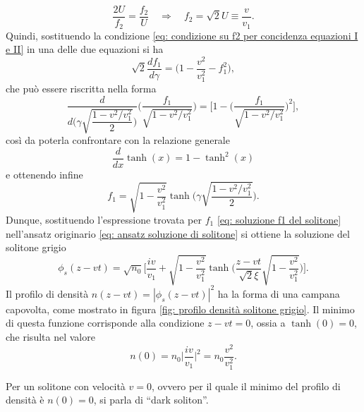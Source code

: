 \begin{equation}
\label{eq: condizione su f2 per concidenza equazioni I e II}
    \frac{2U}{f_2} = \frac{f_2}{U}\quad\Longrightarrow\quad f_2 = \sqrt{2}U \equiv \frac{v}{v_1}.
\end{equation}
Quindi, sostituendo la condizione \eqref{eq: condizione su f2 per concidenza equazioni I e II} in una delle due equazioni si ha
\begin{equation}
    \sqrt{2}\dfrac{df_1}{d\gamma} = \bigg(1 - \frac{v^2}{v_1^2} - f_1^2\bigg),
\end{equation}
che può essere riscritta nella forma 
\begin{equation}
    \frac{d}{d\bigg(\gamma\sqrt{\dfrac{1 - v^2/v_1^2}{2}}\bigg)}\bigg(\frac{f_1}{\sqrt{1 - v^2/v_1^2}}\bigg) = \bigg[ 1 - \bigg(\frac{f_1}{\sqrt{1 - v^2/v_1^2}}\bigg)^2\bigg],
\end{equation}
così da poterla confrontare con la relazione generale
\begin{equation}
    \frac{d}{dx}\tanh{(x)} = 1 - \tanh^2{(x)}
\end{equation}
e ottenendo infine
\begin{equation}
\label{eq: soluzione f1 del solitone}
    f_1 = \sqrt{1 - \frac{v^2}{v_1^2}}\tanh{\bigg(\gamma\sqrt{\frac{1 - v^2/v_1^2}{2}}\bigg)}.
\end{equation}
Dunque, sostituendo l'espressione trovata per $f_1$ \eqref{eq: soluzione f1 del solitone} nell'ansatz originario \eqref{eq: ansatz soluzione di solitone} si ottiene la soluzione del solitone grigio
\begin{equation}
\label{eq: soluzione del solitone grigio}
    \phi_s(z - vt) = \sqrt{n_0}\bigg[\frac{iv}{v_1} + \sqrt{1 - \frac{v^2}{v_1^2}}\tanh{\bigg(\frac{z - vt}{\sqrt{2}\xi}\sqrt{1 - \frac{v^2}{v_1^2}}\bigg)}\bigg].
\end{equation}
Il profilo di densità $n(z - vt) = |\phi_s(z - vt)|^2$ ha la forma di una campana capovolta, come mostrato in figura \ref{fig: profilo densità solitone grigio}. Il minimo di questa funzione corrisponde alla condizione $z - vt = 0$, ossia a $\tanh{(0)} = 0$, che risulta nel valore
\begin{equation}
    n(0) = n_0\bigg|\frac{iv}{v_1}\bigg|^2 = n_0\frac{v^2}{v_1^2}. 
\end{equation}
\begin{obs}
    Per un solitone con velocità $v = 0$, ovvero per il quale il minimo del profilo di densità è $n(0) = 0$, si parla di ``dark soliton''.
\end{obs}
